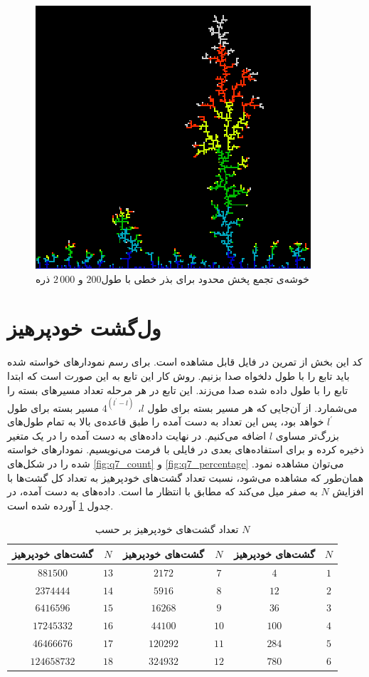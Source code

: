 \documentclass[11pt, a4paper]{article}
\begin{document}
\begin{figure}[h!]
  \centering
  \includegraphics[width=.6\textwidth]{q6_200_2000.png}
  \caption{خوشه‌ی تجمع پخش محدود برای بذر خطی با طول$200$ و $2\,000$ ذره}
  \label{fig:q6_diffusion}
\end{figure}


\section{\textbf{ول‌گشت خودپرهیز}}
کد این بخش از تمرین در فایل
قابل مشاهده است.
برای رسم نمودار‌های خواسته شده باید تابع
را با طول دلخواه صدا بزنیم.
روش کار این تابع به این صورت است که ابتدا تابع
را با طول داده شده صدا می‌زند.
این تابع در هر مرحله تعداد مسیر‌های بسته را می‌شمارد.
از آن‌جایی که هر مسیر‌ بسته برای طول
$l$،
$4^{(l^{'} - l)}$
مسیر بسته برای طول
$l^{'}$
خواهد بود، پس این تعداد به دست آمده را طبق قاعده‌ی بالا به تمام طول‌های بزرگ‌تر مساوی
$l$
اضافه می‌کنیم.
در نهایت داده‌های به دست آمده را در یک متغیر ذخیره کرده و برای استفاده‌های بعدی در فایلی با فرمت
می‌نویسیم.
نمودار‌های خواسته شده را در شکل‌های
\ref{fig:q7_count}
و
\ref{fig:q7_percentage}
می‌توان مشاهده نمود.
همان‌طور که مشاهده می‌شود،
نسبت تعداد گشت‌های خود‌پرهیز به تعداد کل گشت‌ها با افزایش
$N$
به صفر میل می‌کند که مطابق با انتظار ما است.
داده‌های به دست آمده، در جدول
\ref{tab:q7_self_avoid_paths}
آورده شده است.

\begin{table}[h!]
  \centering
  \begin{tabular}{|c|c|c|c|c|c|}
    \hline
    گشت‌های خودپرهیز & $N$ & گشت‌های خودپرهیز & $N$ & گشت‌های خودپرهیز & $N$ \\ \hline
    $881500$ & $13$ & $2172$ & $7$ & $4$ & $1$ \\ \hline
    $2374444$ & $14$ & $5916$ & $8$ & $12$ & $2$ \\ \hline
    $6416596$ & $15$ & $16268$ & $9$ & $36$ & $3$ \\ \hline
    $17245332$ & $16$ & $44100$ & $10$ & $100$ & $4$ \\ \hline
    $46466676$ & $17$ & $120292$ & $11$ & $284$ & $5$ \\ \hline
    $124658732$ & $18$ & $324932$ & $12$ & $780$ & $6$ \\ \hline
  \end{tabular}
  \caption{تعداد گشت‌های خود‌پرهیز بر حسب $N$}
  \label{tab:q7_self_avoid_paths}
\end{table}
\end{document}
